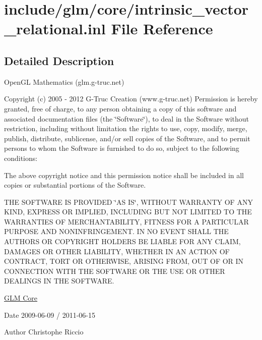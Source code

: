 \hypertarget{intrinsic__vector__relational_8inl}{\section{include/glm/core/intrinsic\-\_\-vector\-\_\-relational.inl \-File \-Reference}
\label{intrinsic__vector__relational_8inl}
}


\subsection{\-Detailed \-Description}
\-Open\-G\-L \-Mathematics (glm.\-g-\/truc.\-net)

\-Copyright (c) 2005 -\/ 2012 \-G-\/\-Truc \-Creation (www.\-g-\/truc.\-net) \-Permission is hereby granted, free of charge, to any person obtaining a copy of this software and associated documentation files (the \char`\"{}\-Software\char`\"{}), to deal in the \-Software without restriction, including without limitation the rights to use, copy, modify, merge, publish, distribute, sublicense, and/or sell copies of the \-Software, and to permit persons to whom the \-Software is furnished to do so, subject to the following conditions\-:

\-The above copyright notice and this permission notice shall be included in all copies or substantial portions of the \-Software.

\-T\-H\-E \-S\-O\-F\-T\-W\-A\-R\-E \-I\-S \-P\-R\-O\-V\-I\-D\-E\-D \char`\"{}\-A\-S I\-S\char`\"{}, \-W\-I\-T\-H\-O\-U\-T \-W\-A\-R\-R\-A\-N\-T\-Y \-O\-F \-A\-N\-Y \-K\-I\-N\-D, \-E\-X\-P\-R\-E\-S\-S \-O\-R \-I\-M\-P\-L\-I\-E\-D, \-I\-N\-C\-L\-U\-D\-I\-N\-G \-B\-U\-T \-N\-O\-T \-L\-I\-M\-I\-T\-E\-D \-T\-O \-T\-H\-E \-W\-A\-R\-R\-A\-N\-T\-I\-E\-S \-O\-F \-M\-E\-R\-C\-H\-A\-N\-T\-A\-B\-I\-L\-I\-T\-Y, \-F\-I\-T\-N\-E\-S\-S \-F\-O\-R \-A \-P\-A\-R\-T\-I\-C\-U\-L\-A\-R \-P\-U\-R\-P\-O\-S\-E \-A\-N\-D \-N\-O\-N\-I\-N\-F\-R\-I\-N\-G\-E\-M\-E\-N\-T. \-I\-N \-N\-O \-E\-V\-E\-N\-T \-S\-H\-A\-L\-L \-T\-H\-E \-A\-U\-T\-H\-O\-R\-S \-O\-R \-C\-O\-P\-Y\-R\-I\-G\-H\-T \-H\-O\-L\-D\-E\-R\-S \-B\-E \-L\-I\-A\-B\-L\-E \-F\-O\-R \-A\-N\-Y \-C\-L\-A\-I\-M, \-D\-A\-M\-A\-G\-E\-S \-O\-R \-O\-T\-H\-E\-R \-L\-I\-A\-B\-I\-L\-I\-T\-Y, \-W\-H\-E\-T\-H\-E\-R \-I\-N \-A\-N \-A\-C\-T\-I\-O\-N \-O\-F \-C\-O\-N\-T\-R\-A\-C\-T, \-T\-O\-R\-T \-O\-R \-O\-T\-H\-E\-R\-W\-I\-S\-E, \-A\-R\-I\-S\-I\-N\-G \-F\-R\-O\-M, \-O\-U\-T \-O\-F \-O\-R \-I\-N \-C\-O\-N\-N\-E\-C\-T\-I\-O\-N \-W\-I\-T\-H \-T\-H\-E \-S\-O\-F\-T\-W\-A\-R\-E \-O\-R \-T\-H\-E \-U\-S\-E \-O\-R \-O\-T\-H\-E\-R \-D\-E\-A\-L\-I\-N\-G\-S \-I\-N \-T\-H\-E \-S\-O\-F\-T\-W\-A\-R\-E.

\hyperlink{group__core}{\-G\-L\-M \-Core}

\begin{DoxyDate}{\-Date}
2009-\/06-\/09 / 2011-\/06-\/15 
\end{DoxyDate}
\begin{DoxyAuthor}{\-Author}
\-Christophe \-Riccio 
\end{DoxyAuthor}
